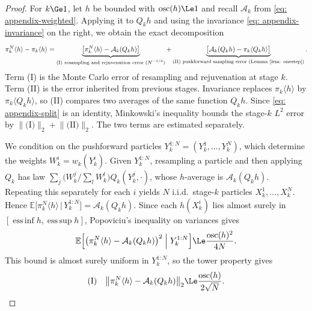 \documentclass{article}
\begin{document}
\begin{proof}
For $k\Ge1$, let $h$ be bounded with $\operatorname{osc}(h)\Le1$ and recall $\mathcal A_k$ from \eqref{eq: appendix-weighted}. Applying it to $Q_kh$ and using the invariance \eqref{eq: appendix-invariance} on the right, we obtain the exact decomposition
\begin{equation}
    \pi_k^N\langle h\rangle-\pi_k\langle h\rangle
    = \underbrace{\bigl[\pi_k^N\langle h\rangle-\mathcal A_k(Q_kh)\bigr]}_{\text{(I) resampling and rejuvenation error ($N^{-1/2}$)}}
    + \underbrace{\bigl[\mathcal A_k(Q_kh)-\pi_k\langle Q_kh\rangle\bigr]}_{\text{(II) pushforward sampling error (Lemma~\ref{lem: onestep})}} .
    \label{eq: appendix-split}
\end{equation}
Term (I) is the Monte Carlo error of resampling and rejuvenation at stage $k$. Term (II) is the error inherited from previous stages. Invariance replaces $\pi_k\langle h\rangle$ by $\pi_k\langle Q_kh\rangle$, so (II) compares two averages of the same function $Q_kh$. Since \eqref{eq: appendix-split} is an identity, Minkowski's inequality bounds the stage-$k$ $L^2$ error by $\lVert\text{(I)}\rVert_2+\lVert\text{(II)}\rVert_2$. The two terms are estimated separately.

We condition on the pushforward particles $Y_k^{1:N}=(Y_k^1,\dots,Y_k^N)$, which determine the weights $W_k^i=w_k(Y_k^i)$. Given $Y_k^{1:N}$, resampling a particle and then applying $Q_k$ has law $\sum_{j}\bigl(W_k^j/\sum_l W_k^l\bigr)Q_k(Y_k^j,\cdot)$, whose $h$-average is $\mathcal A_k(Q_kh)$. Repeating this separately for each $i$ yields $N$ i.i.d.\ stage-$k$ particles $X_k^1,\dots,X_k^N$.
Hence $\mathbb E\bigl[\pi_k^N\langle h\rangle\,\big|\, Y_k^{1:N}\bigr]=\mathcal A_k(Q_kh)$. Since each $h(X_k^i)$ lies almost surely in $[\operatorname{ess\,inf}h,\operatorname{ess\,sup}h]$, Popoviciu's inequality on variances gives
\begin{equation*}
    \mathbb E\Bigl[\bigl(\pi_k^N\langle h\rangle-\mathcal A_k(Q_kh)\bigr)^{2}\Bigm| Y_k^{1:N}\Bigr]
    \Le \frac{\operatorname{osc}(h)^{2}}{4N} .
\end{equation*}
This bound is almost surely uniform in $Y_k^{1:N}$, so the tower property gives
\begin{equation}
	\text{(I)} \quad
    \bigl\lVert\pi_k^N\langle h\rangle-\mathcal A_k(Q_kh)\bigr\rVert_2 \Le \frac{\operatorname{osc}(h)}{2\sqrt N} .
    \label{eq: appendix-resample}
\end{equation}


\end{proof}
\end{document}
